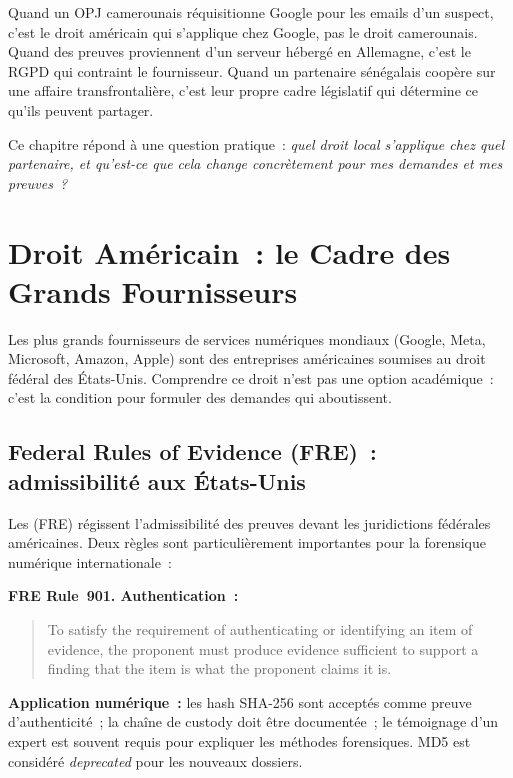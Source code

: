 Quand un OPJ camerounais réquisitionne Google pour les emails d'un suspect,
c'est le droit américain qui s'applique chez Google, pas le droit camerounais.
Quand des preuves proviennent d'un serveur hébergé en Allemagne, c'est le RGPD
qui contraint le fournisseur. Quand un partenaire sénégalais coopère sur une
affaire transfrontalière, c'est leur propre cadre législatif qui détermine ce
qu'ils peuvent partager.

Ce chapitre répond à une question pratique~: \emph{quel droit local s'applique
chez quel partenaire, et qu'est-ce que cela change concrètement pour mes
demandes et mes preuves~?}

\separateur

\section{Droit Américain~: le Cadre des Grands Fournisseurs}
\label{sec:droit-usa}

Les plus grands fournisseurs de services numériques mondiaux (Google,
Meta, Microsoft, Amazon, Apple) sont des entreprises américaines soumises
au droit fédéral des États-Unis. Comprendre ce droit n'est pas une option
académique~: c'est la condition pour formuler des demandes qui aboutissent.

\subsection{Federal Rules of Evidence (FRE)~: admissibilité aux États-Unis}

Les 
(FRE) régissent l'admissibilité des preuves devant les juridictions fédérales
américaines. Deux règles sont particulièrement importantes pour la forensique
numérique internationale~:

\begin{boxjuris}
\textbf{FRE Rule~901. Authentication~:}
\begin{quote}
To satisfy the requirement of authenticating or identifying an item of
evidence, the proponent must produce evidence sufficient to support a finding
that the item is what the proponent claims it is.
\end{quote}
\textbf{Application numérique~:} les hash SHA-256 sont acceptés comme preuve
d'authenticité~; la chaîne de custody doit être documentée~; le témoignage
d'un expert est souvent requis pour expliquer les méthodes forensiques.
MD5 est considéré \emph{deprecated} pour les nouveaux dossiers.
\end{boxjuris}

